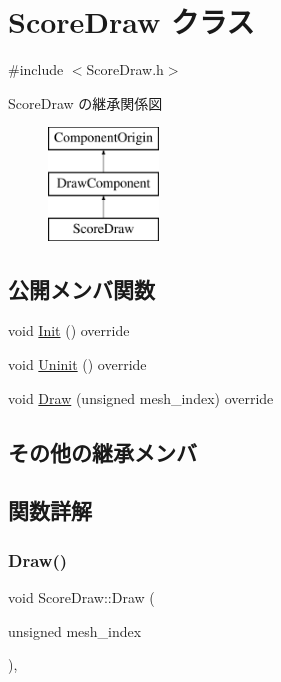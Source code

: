 \hypertarget{class_score_draw}{}\section{Score\+Draw クラス}
\label{class_score_draw}


{\ttfamily \#include $<$Score\+Draw.\+h$>$}

Score\+Draw の継承関係図\begin{figure}[H]
\begin{center}
\leavevmode
\includegraphics[height=3.000000cm]{class_score_draw}
\end{center}
\end{figure}
\subsection*{公開メンバ関数}
\begin{DoxyCompactItemize}
\item 
void \mbox{\hyperlink{class_score_draw_af013abb96136825e71d4fee06529fc69}{Init}} () override
\item 
void \mbox{\hyperlink{class_score_draw_aad744f8a7a1202e6ba8117c660f297ee}{Uninit}} () override
\item 
void \mbox{\hyperlink{class_score_draw_a0744dd3db298a45683b7521a02e8e9db}{Draw}} (unsigned mesh\+\_\+index) override
\end{DoxyCompactItemize}
\subsection*{その他の継承メンバ}


\subsection{関数詳解}
\mbox{\label{class_score_draw_a0744dd3db298a45683b7521a02e8e9db}} 
\subsubsection{\texorpdfstring{Draw()}{Draw()}}
{\footnotesize\ttfamily void Score\+Draw\+::\+Draw (\begin{DoxyParamCaption}\item[{unsigned}]{mesh\+\_\+index }\end{DoxyParamCaption})\hspace{0.3cm}{\ttfamily [override]}, {\ttfamily [virtual]}}



